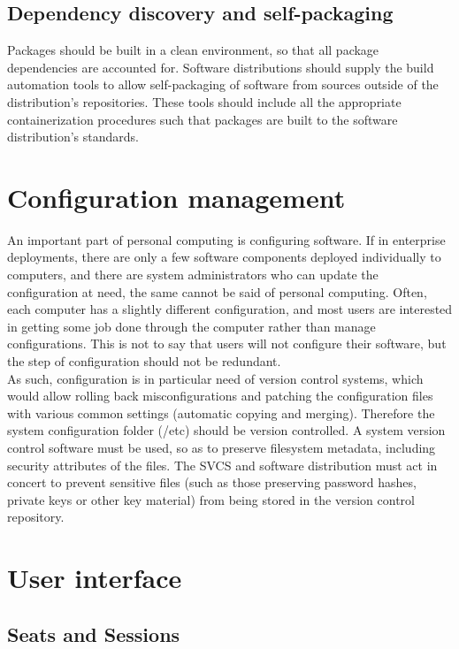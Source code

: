 \documentclass[a4paper,utf8,11pt]{article}
\begin{document}
	\subsection{Dependency discovery and self-packaging}
	Packages should be built in a clean environment, so that all package dependencies are accounted for. Software distributions should supply the build automation tools to allow self-packaging of software from sources outside of the distribution's repositories. These tools should include all the appropriate containerization procedures such that packages are built to the software distribution's standards.
	\clearpage
	\section{Configuration management}
	An important part of personal computing is configuring software. If in enterprise deployments, there are only a few software components deployed individually to computers, and there are system administrators who can update the configuration at need, the same cannot be said of personal computing. Often, each computer has a slightly different configuration, and most users are interested in getting some job done through the computer rather than manage configurations. This is not to say that users will not configure their software, but the step of configuration should not be redundant.\\
	As such, configuration is in particular need of version control systems, which would allow rolling back misconfigurations and patching the configuration files with various common settings (automatic copying and merging). Therefore the system configuration folder (/etc) should be version controlled. A system version control software must be used, so as to preserve filesystem metadata, including security attributes of the files. The SVCS and software distribution must act in concert to prevent sensitive files (such as those preserving password hashes, private keys or other key material) from being stored in the version control repository.
	\clearpage
	\section{User interface}
	\subsection{Seats and Sessions}
\end{document}
